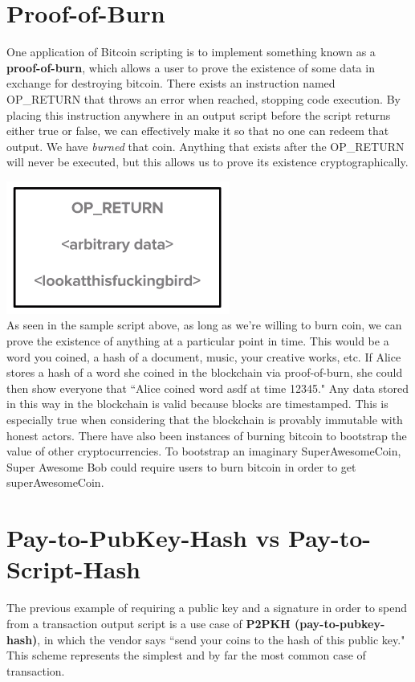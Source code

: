 \documentclass[full.tex]{subfiles}
\begin{document}
 \section*{Proof-of-Burn}
 
 One application of Bitcoin scripting is to implement something known as a \textbf{proof-of-burn}, which allows a user to prove the existence of some data in exchange for destroying bitcoin. There exists an instruction named OP\_RETURN that throws an error when reached, stopping code execution. By placing this instruction anywhere in an output script before the script returns either true or false, we can effectively make it so that no one can redeem that output. We have \textit{burned} that coin. Anything that exists after the OP\_RETURN will never be executed, but this allows us to prove its existence cryptographically.
 
 \includegraphics[scale=1]{burn_script} \\
 
 As seen in the sample script above, as long as we're willing to burn coin, we can prove the existence of anything at a particular point in time. This would be a word you coined, a hash of a document, music, your creative works, etc. If Alice stores a hash of a word she coined in the blockchain via proof-of-burn, she could then show everyone that ``Alice coined word asdf at time 12345." Any data stored in this way in the blockchain is valid because blocks are timestamped. This is especially true when considering that the blockchain is provably immutable with honest actors. There have also been instances of burning bitcoin to bootstrap the value of other cryptocurrencies. To bootstrap an imaginary SuperAwesomeCoin, Super Awesome Bob could require users to burn bitcoin in order to get superAwesomeCoin. 
 
 \section*{Pay-to-PubKey-Hash vs Pay-to-Script-Hash}
 
 The previous example of requiring a public key and a signature in order to spend from a transaction output script is a use case of \textbf{P2PKH (pay-to-pubkey-hash)}, in which the vendor says ``send your coins to the hash of this public key." This scheme represents the simplest and by far the most common case of transaction.
 
\end{document}
